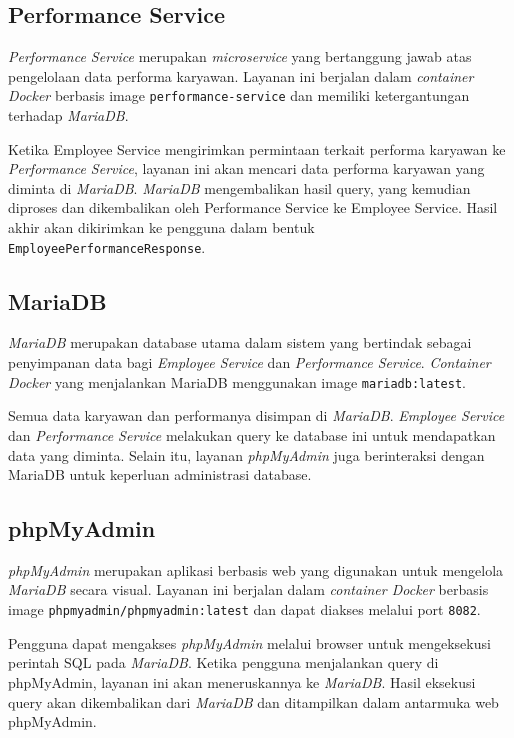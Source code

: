 \subsection{Performance Service}

\textit{Performance Service} merupakan \textit{microservice} yang bertanggung jawab atas pengelolaan data performa karyawan. Layanan ini berjalan dalam \textit{container Docker} berbasis image \texttt{performance-service} dan memiliki ketergantungan terhadap \textit{MariaDB}.

Ketika Employee Service mengirimkan permintaan terkait performa karyawan ke \textit{Performance Service}, layanan ini akan mencari data performa karyawan yang diminta di \textit{MariaDB}. \textit{MariaDB} mengembalikan hasil query, yang kemudian diproses dan dikembalikan oleh Performance Service ke Employee Service. Hasil akhir akan dikirimkan ke pengguna dalam bentuk \texttt{EmployeePerformanceResponse}.

\subsection{MariaDB}

\textit{MariaDB} merupakan database utama dalam sistem yang bertindak sebagai penyimpanan data bagi \textit{Employee Service} dan \textit{Performance Service}. \textit{Container Docker} yang menjalankan MariaDB menggunakan image \texttt{mariadb:latest}.

Semua data karyawan dan performanya disimpan di \textit{MariaDB}. \textit{Employee Service} dan \textit{Performance Service} melakukan query ke database ini untuk mendapatkan data yang diminta. Selain itu, layanan \textit{phpMyAdmin} juga berinteraksi dengan MariaDB untuk keperluan administrasi database.

\subsection{phpMyAdmin}

\textit{phpMyAdmin} merupakan aplikasi berbasis web yang digunakan untuk mengelola \textit{MariaDB} secara visual. Layanan ini berjalan dalam \textit{container Docker} berbasis image \texttt{phpmyadmin/\-phpmyadmin:\-latest} dan dapat diakses melalui port \texttt{8082}.

Pengguna dapat mengakses \textit{phpMyAdmin} melalui browser untuk mengeksekusi perintah SQL pada \textit{MariaDB}. Ketika pengguna menjalankan query di phpMyAdmin, layanan ini akan meneruskannya ke \textit{MariaDB}. Hasil eksekusi query akan dikembalikan dari \textit{MariaDB} dan ditampilkan dalam antarmuka web phpMyAdmin.


